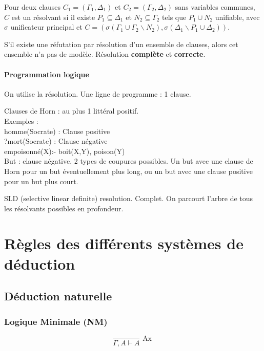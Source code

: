 \documentclass[french]{article}
\begin{document}
Pour deux clauses $C_1 = (\Gamma_1, \Delta_1)$ et  $C_2 = (\Gamma_2, \Delta_2)$ sans variables communes, $C$ est un résolvant si il existe $P_1\subseteq\Delta_1$ et $N_2\subseteq\Gamma_2$ tels que $P_1\cup N_2$ unifiable, avec $\sigma$ unificateur principal et $C = (\sigma(\Gamma_1\cup\Gamma_2\backslash N_2), \sigma(\Delta_1\backslash P_1\cup\Delta_2))$.

S'il existe une réfutation par résolution d'un ensemble de clauses, alors cet ensemble n'a pas de modèle. Résolution \textbf{complète} et \textbf{correcte}.

\paragraph{Programmation logique}
On utilise la résolution. Une ligne de programme : 1 clause.

Clauses de Horn : au plus 1 littéral positif.\\
Exemples : \\
homme(Socrate) : Clause positive\\
?mort(Socrate) : Clause négative\\
empoisonné(X):- boit(X,Y), poison(Y)\\

But : clause négative. 2 types de coupures possibles. Un but avec une clause de Horn pour un but éventuellement plus long, ou un but avec une clause positive pour un but plus court.

SLD (selective linear definite) resolution. Complet. On parcourt l'arbre de tous les résolvants possibles en profondeur.
\newpage
\appendix

\section{Règles des différents systèmes de déduction}

\subsection{Déduction naturelle}

\subsubsection{Logique Minimale (NM)}

\[\dfrac{}{\Gamma,A\vdash A} \text{ Ax }\]
\end{document}
